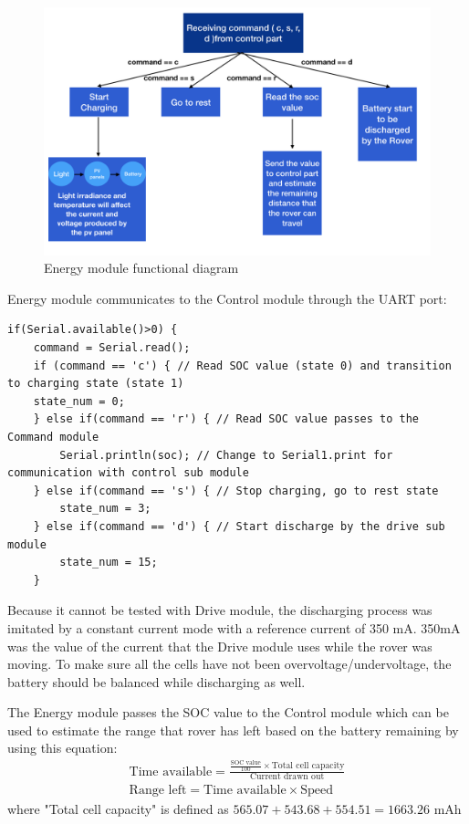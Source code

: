 \documentclass[11pt, a4paper]{article}
\begin{document}
\begin{figure} [h!]
    \centering
    \includegraphics[scale=0.25]{Energy_functional.PNG}
    \caption{Energy module functional diagram}
\end{figure}

Energy module communicates to the Control module through the UART port:

\begin{lstlisting}
if(Serial.available()>0) {
    command = Serial.read();
    if (command == 'c') { // Read SOC value (state 0) and transition to charging state (state 1)
    state_num = 0;
    } else if(command == 'r') { // Read SOC value passes to the Command module
        Serial.println(soc); // Change to Serial1.print for communication with control sub module
    } else if(command == 's') { // Stop charging, go to rest state
        state_num = 3;
    } else if(command == 'd') { // Start discharge by the drive sub module
        state_num = 15;
    }
\end{lstlisting}

Because it cannot be tested with Drive module, the discharging process was imitated by a constant current mode with a reference current of 350 mA. 350mA was the value of the current that the Drive module uses while the rover was moving. To make sure all the cells have not been overvoltage/undervoltage, the battery should be balanced while discharging as well.

The Energy module passes the SOC value to the Control module which can be used to estimate the range that rover has left based on the battery remaining by using this equation:
\begin{gather*}
    \text{Time available} = \frac{\frac{\text{SOC value}}{100} \times \text{Total cell capacity}}{\text{Current drawn out}} \\
    \text{Range left} = \text{Time available} \times \text{Speed}
\end{gather*}
where "Total cell capacity" is defined as $565.07 + 543.68 + 554.51 = 1663.26$ mAh
\end{document}
